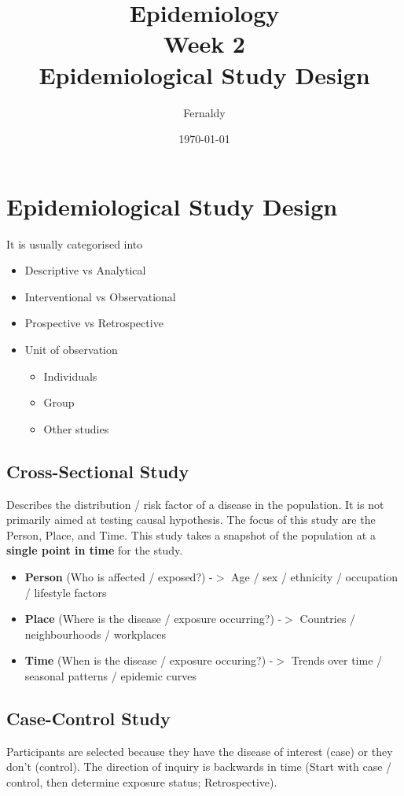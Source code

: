 \documentclass{article}
\title{Epidemiology\\Week 2\\Epidemiological Study Design}
\author{Fernaldy}
\date{\today}
\begin{document}
\maketitle

\section*{Epidemiological Study Design}
It is usually categorised into
\begin{itemize}
    \item Descriptive vs Analytical
    \item Interventional vs Observational
    \item Prospective vs Retrospective
    \item Unit of observation
        \begin{itemize}
            \item Individuals
            \item Group
            \item Other studies
        \end{itemize}
\end{itemize}

\subsection{Cross-Sectional Study}
Describes the distribution / risk factor of a disease in the population. It is not primarily aimed at
testing causal hypothesis. The focus of this study are the Person, Place, and Time. This study takes a snapshot of the population at a \textbf{single point in time} for the study.
\begin{itemize}
    \item \textbf{Person} (Who is affected / exposed?) -$>$ Age / sex / ethnicity / occupation / lifestyle factors
    \item \textbf{Place} (Where is the disease / exposure occurring?) -$>$ Countries / neighbourhoods / workplaces
    \item \textbf{Time} (When is the disease / exposure occuring?) -$>$ Trends over time / seasonal patterns / epidemic curves
\end{itemize}

\subsection{Case-Control Study}
Participants are selected because they have the disease of interest (case) or they don't (control). The direction of inquiry is backwards in time (Start with case / control, then determine exposure status; Retrospective).
\end{document}
